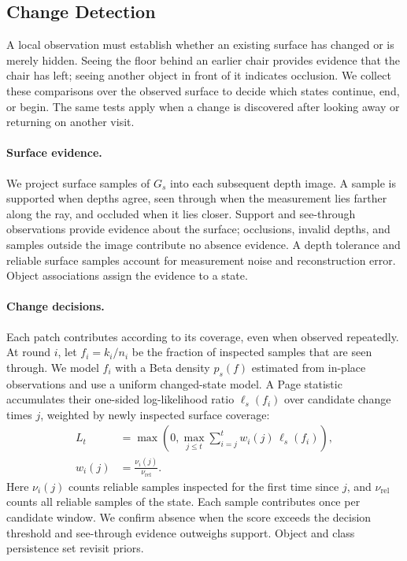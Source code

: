 \subsection{Change Detection}
\label{sec:states}

A local observation must establish whether an existing surface has changed or is merely hidden.
Seeing the floor behind an earlier chair provides evidence that the chair has left; seeing another object
in front of it indicates occlusion. We collect these comparisons over the observed surface to decide
which states continue, end, or begin. The same tests apply when a change is discovered after looking
away or returning on another visit.

\paragraph{Surface evidence.}
We project surface samples of $G_s$ into each subsequent depth image.
A sample is supported when depths agree, seen through when the measurement lies farther along the ray,
and occluded when it lies closer. Support and see-through observations provide evidence about the surface;
occlusions, invalid depths, and samples outside the image contribute no absence evidence.
A depth tolerance and reliable surface samples account for measurement noise and reconstruction error.
Object associations assign the evidence to a state.

\paragraph{Change decisions.}
Each patch contributes according to its coverage, even when observed repeatedly.
At round $i$, let $f_i=k_i/n_i$ be the fraction of inspected samples that are seen through.
We model $f_i$ with a Beta density $p_s(f)$ estimated from in-place observations and use a uniform
changed-state model. A Page statistic~\cite{page1954cusum} accumulates their one-sided log-likelihood ratio
$\ell_s(f_i)$ over candidate change times $j$, weighted by newly inspected surface coverage:
\begin{equation}
\begin{aligned}
  L_t&=\max\!\left(0,\max_{j\leq t}\sum_{i=j}^{t}w_i(j)\,\ell_s(f_i)\right),\\
  w_i(j)&=\frac{\nu_i(j)}{\nu_{\mathrm{rel}}}.
\end{aligned}
\label{eq:absence}
\end{equation}
Here $\nu_i(j)$ counts reliable samples inspected for the first time since $j$, and $\nu_{\mathrm{rel}}$
counts all reliable samples of the state. Each sample contributes once per candidate window.
We confirm absence when the score exceeds
the decision threshold and see-through evidence outweighs support. Object and class persistence set revisit priors.

